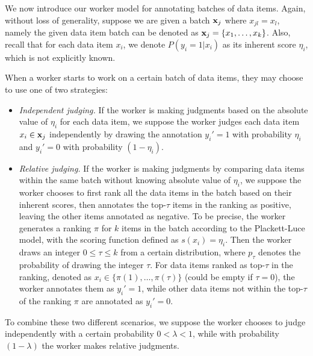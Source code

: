 %

We now introduce our worker model for annotating batches of data items.
Again, without loss of generality, suppose we are given a batch ${\mathbf{x}}_j$ where $x_{jl} = x_l$,
namely the given data item batch can be denoted as ${\mathbf{x}}_j=\{x_1, \ldots, x_k\}$.
Also, recall that for each data item $x_i$, we denote $P(y_i = 1 | x_i)$ as its inherent score $\eta_i$,
which is not explicitly known. 

When a worker starts to work on a certain batch of data items,
they may choose to use one of two strategies:
\begin{itemize}
  \item \emph{Independent judging.}
  If the worker is making judgments based on the absolute value of $\eta_i$ for each data item, 
  we suppose the worker judges each data item $x_i \in {\mathbf{x}}_j$ independently
  by drawing the annotation $y_i'=1$ with probability $\eta_i$ and $y_i' = 0$ with probability $(1 - \eta_i)$.
  \item \emph{Relative judging.}
  If the worker is making judgments by comparing data items within the same batch
  without knowing absolute value of $\eta_i$,
  we suppose the worker chooses to first rank all the data items in the batch based on their inherent scores,
  then annotates the top-$\tau$ items in the ranking as positive, leaving the other items annotated as negative.
  To be precise, the worker generates a ranking $\pi$ for $k$ items in the batch according to the Plackett-Luce model,
  with the scoring function defined as $s(x_i) = \eta_i$.
  Then the worker draws an integer $0 \leq \tau \leq k$ from a certain distribution,
  where $p_\tau$ denotes the probability of drawing the integer $\tau$.
  For data items ranked as top-$\tau$ in the ranking,
  denoted as $x_i \in \{\pi(1), \ldots, \pi(\tau)\}$ (could be empty if $\tau = 0$),
  the worker annotates them as $y_i'=1$,
  while other data items not within the top-$\tau$ of the ranking $\pi$ are annotated as $y_i' = 0$.
\end{itemize}
To combine these two different scenarios,
we suppose the worker chooses to judge independently with a certain probability $0 < \lambda < 1$,
while with probability $(1-\lambda)$ the worker makes relative judgments.

